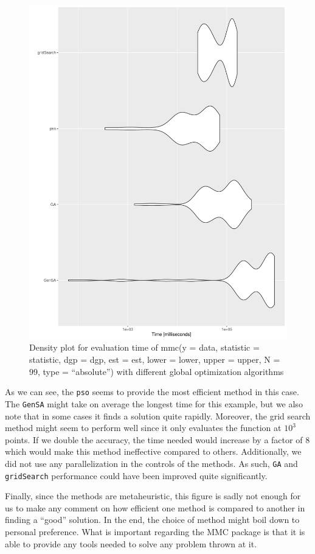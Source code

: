 \documentclass[11pt]{article}\usepackage[]{graphicx}\usepackage[]{color}
\newcommand{\pkg}[1]{{\normalfont\fontseries{b}\selectfont #1}}
\let\code=\texttt
\begin{document}
\begin{figure}[H]
\centering
\includegraphics[width=0.9\linewidth]{fig/BF_compare}
\caption{Density plot for evaluation time of mmc(y = data, statistic = statistic, dgp = dgp, est = est, lower = lower, upper = upper, N = 99,	type = ``absolute'') with different global optimization algorithms}
\label{fig:bfcompare}
\end{figure}

As we can see, the \code{pso} seems to provide the most efficient method in this case. The \code{GenSA} might take on average the longest time for this example, but we also note that in some cases it finds a solution quite rapidly. Moreover, the grid search method might seem to perform well since it only evaluates the function at $10^3$ points. If we double the accuracy, the time needed would increase by a factor of 8 which would make this method ineffective compared to others. Additionally, we did not use any parallelization in the controls of the methods. As such, \code{GA} and \code{gridSearch} performance could have been improved quite significantly.

Finally, since the methods are metaheuristic, this figure is sadly not enough for us to make any comment on how efficient one method is compared to another in finding a ``good'' solution. In the end, the choice of method might boil down to personal preference. What is important regarding the \pkg{MMC} package is that it is able to provide any tools needed to solve any problem thrown at it.
\end{document}

